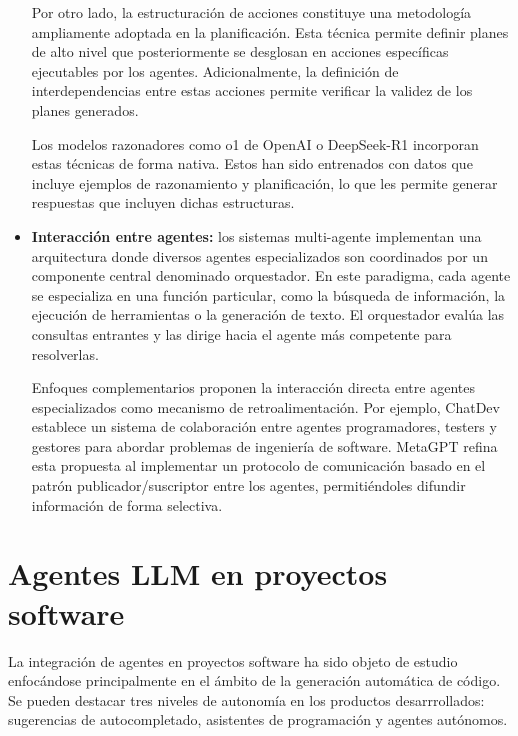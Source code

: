 \begin{itemize}
Por otro lado, la estructuración de acciones constituye una metodología ampliamente adoptada en la planificación\cite{lin_swiftsage_nodate}\cite{huang_language_nodate}\cite{wang_describe_2024}. Esta técnica permite definir planes de alto nivel que posteriormente se desglosan en acciones específicas ejecutables por los agentes\cite{zhu_ghost_2023}\cite{song_llm-planner_2023}\cite{wang_voyager_2023}\cite{liu_odyssey_2024}. Adicionalmente, la definición de interdependencias entre estas acciones permite verificar la validez de los planes generados\cite{raman_planning_nodate}\cite{liu_llmp_2023}\cite{dagan_dynamic_2023}.

Los modelos razonadores como o1 de OpenAI o DeepSeek-R1 incorporan estas técnicas de forma nativa\cite{noauthor_deepseek-r1deepseek_r1pdf_nodate}. Estos han sido entrenados con datos que incluye ejemplos de razonamiento y planificación, lo que les permite generar respuestas que incluyen dichas estructuras.


\item{\textbf{Interacción entre agentes: }}los sistemas multi-agente implementan una arquitectura donde diversos agentes especializados son coordinados por un componente central denominado orquestador\cite{karpas_mrkl_2022}\cite{ge_openagi_nodate}. En este paradigma, cada agente se especializa en una función particular, como la búsqueda de información, la ejecución de herramientas o la generación de texto. El orquestador evalúa las consultas entrantes y las dirige hacia el agente más competente para resolverlas.

Enfoques complementarios proponen la interacción directa entre agentes especializados como mecanismo de retroalimentación\cite{zhuge_mindstorms_2023}\cite{du_improving_nodate}. Por ejemplo, ChatDev\cite{qian_chatdev_2024} establece un sistema de colaboración entre agentes programadores, testers y gestores para abordar problemas de ingeniería de software. MetaGPT\cite{hong_metagpt_2024} refina esta propuesta al implementar un protocolo de comunicación basado en el patrón publicador/suscriptor entre los agentes, permitiéndoles difundir información de forma selectiva. 
\end{itemize}


\section{Agentes LLM en proyectos software}

La integración de agentes en proyectos software ha sido objeto de estudio enfocándose principalmente en el ámbito de la generación automática de código. Se pueden destacar tres niveles de autonomía en los productos desarrrollados: sugerencias de autocompletado, asistentes de programación y agentes autónomos. 


